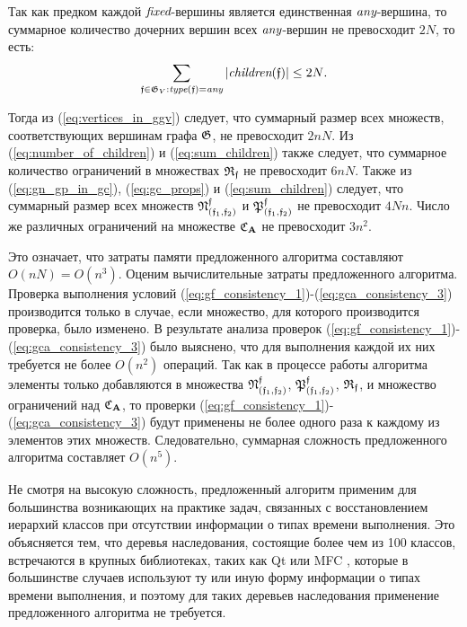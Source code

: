 Так как предком каждой $\textit{fixed}$-вершины является единственная $\textit{any}$-вершина, то суммарное количество дочерних вершин всех $\textit{any}$-вершин не превосходит $2N$, то есть:
\begin{equation}\label{eq:sum_children}
\sum_{\mathfrak{f} \in \mathfrak{G}_V: \textit{type}(\mathfrak{f}) = \textit{any}} |\textit{children}(\mathfrak{f})| \le 2N \text{.}
\end{equation}

Тогда из (\ref{eq:vertices_in_ggv}) следует, что суммарный размер всех множеств, соответствующих вершинам графа $\mathfrak{G}$, не превосходит $2nN$. Из (\ref{eq:number_of_children}) и (\ref{eq:sum_children}) также следует, что суммарное количество ограничений в множествах $\mathfrak{R}_{\mathfrak{f}}$ не превосходит $6nN$. Также из (\ref{eq:gn_gp_in_gc}), (\ref{eq:gc_props}) и (\ref{eq:sum_children}) следует, что суммарный размер всех множеств $\mathfrak{N}^{\mathfrak{f}}_{(\mathfrak{f}_1, \mathfrak{f}_2)}$ и $\mathfrak{P}^{\mathfrak{f}}_{(\mathfrak{f}_1, \mathfrak{f}_2)}$ не превосходит $4Nn$. Число же различных ограничений на множестве $\mathfrak{C}_{\mathbf{A}}$ не превосходит $3n^2$.

Это означает, что затраты памяти предложенного алгоритма составляют $O(nN) = O(n^3)$. Оценим вычислительные затраты предложенного алгоритма. Проверка выполнения условий (\ref{eq:gf_consistency_1})-(\ref{eq:gca_consistency_3}) производится только в случае, если множество, для которого производится проверка, было изменено. В результате анализа проверок (\ref{eq:gf_consistency_1})-(\ref{eq:gca_consistency_3}) было выяснено, что для выполнения каждой их них требуется не более $O(n^2)$ операций. Так как в процессе работы алгоритма элементы только добавляются в множества $\mathfrak{N}^{\mathfrak{f}}_{(\mathfrak{f}_1, \mathfrak{f}_2)}$, $\mathfrak{P}^{\mathfrak{f}}_{(\mathfrak{f}_1, \mathfrak{f}_2)}$, $\mathfrak{R}_{\mathfrak{f}}$, и множество ограничений над $\mathfrak{C}_{\mathbf{A}}$, то проверки (\ref{eq:gf_consistency_1})-(\ref{eq:gca_consistency_3}) будут применены не более одного раза к каждому из элементов этих множеств. Следовательно, суммарная сложность предложенного алгоритма составляет $O(n^5)$.

Не смотря на высокую сложность, предложенный алгоритм применим для большинства возникающих на практике задач, связанных с восстановлением иерархий классов при отсутствии информации о типах времени выполнения. Это объясняется тем, что деревья наследования, состоящие более чем из 100 классов, встречаются в крупных библиотеках, таких как Qt \cite{qt} или MFC \cite{mfc}, которые в большинстве случаев используют ту или иную форму информации о типах времени выполнения, и поэтому для таких деревьев наследования применение предложенного алгоритма не требуется.



